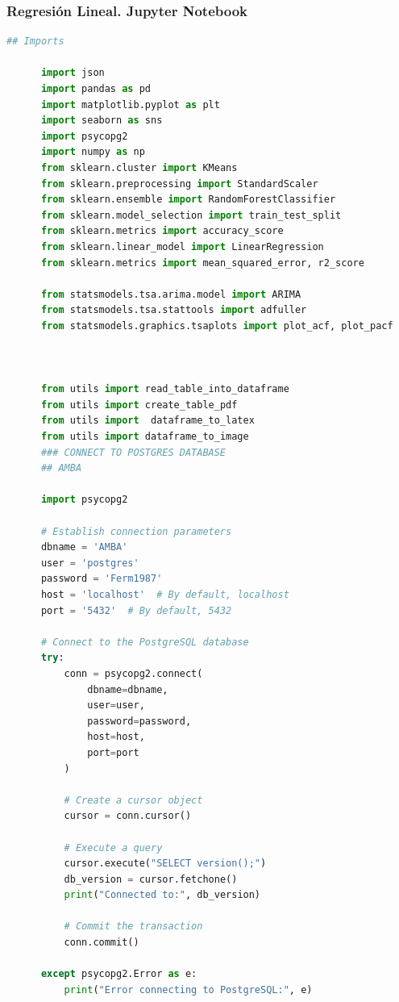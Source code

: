 \documentclass{article}
\theoremstyle{mytheoremstyle}
\theoremstyle{mytheoremstyle}
\theoremstyle{myproblemstyle}
\begin{document}
\subsubsection{Regresión Lineal. Jupyter Notebook} 
   \begin{lstlisting}[language=Python, caption= Regresion Lineal.ipynb,label={lst:LR.ipynb}]
      ## Imports

      import json
      import pandas as pd
      import matplotlib.pyplot as plt
      import seaborn as sns
      import psycopg2
      import numpy as np
      from sklearn.cluster import KMeans
      from sklearn.preprocessing import StandardScaler
      from sklearn.ensemble import RandomForestClassifier
      from sklearn.model_selection import train_test_split
      from sklearn.metrics import accuracy_score
      from sklearn.linear_model import LinearRegression
      from sklearn.metrics import mean_squared_error, r2_score
      
      from statsmodels.tsa.arima.model import ARIMA
      from statsmodels.tsa.stattools import adfuller
      from statsmodels.graphics.tsaplots import plot_acf, plot_pacf
      
      
      
      from utils import read_table_into_dataframe
      from utils import create_table_pdf
      from utils import  dataframe_to_latex
      from utils import dataframe_to_image
      ### CONNECT TO POSTGRES DATABASE
      ## AMBA
      
      import psycopg2
      
      # Establish connection parameters
      dbname = 'AMBA'
      user = 'postgres'
      password = 'Ferm1987'
      host = 'localhost'  # By default, localhost
      port = '5432'  # By default, 5432
      
      # Connect to the PostgreSQL database
      try:
          conn = psycopg2.connect(
              dbname=dbname,
              user=user,
              password=password,
              host=host,
              port=port
          )
      
          # Create a cursor object
          cursor = conn.cursor()
      
          # Execute a query
          cursor.execute("SELECT version();")
          db_version = cursor.fetchone()
          print("Connected to:", db_version)
      
          # Commit the transaction
          conn.commit()
      
      except psycopg2.Error as e:
          print("Error connecting to PostgreSQL:", e)
      

\end{lstlisting}
\end{document}
